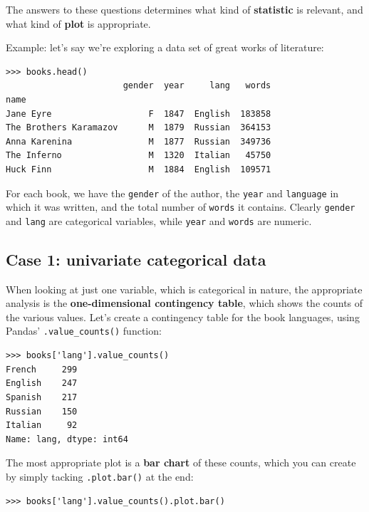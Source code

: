 The answers to these questions determines what kind of \textbf{statistic} is
relevant, and what kind of \textbf{plot} is appropriate.

\bigskip
Example: let's say we're exploring a data set of great works of literature:

\begin{Verbatim}[fontsize=\normalsize,samepage=true,frame=single]
>>> books.head()
                       gender  year     lang   words
name                                                
Jane Eyre                   F  1847  English  183858
The Brothers Karamazov      M  1879  Russian  364153
Anna Karenina               M  1877  Russian  349736
The Inferno                 M  1320  Italian   45750
Huck Finn                   M  1884  English  109571
\end{Verbatim}

For each book, we have the \texttt{gender} of the author, the \texttt{year}
and \texttt{language} in which it was written, and the total number of
\texttt{words} it contains. Clearly \texttt{gender} and \texttt{lang} are
categorical variables, while \texttt{year} and \texttt{words} are numeric.

\pagebreak
\subsection{Case 1: univariate categorical data}
\label{contingencyTable}

When looking at just one variable, which is categorical in nature, the
appropriate analysis is the \textbf{one-dimensional contingency table}, which
shows the counts of the various values. Let's create a contingency table for
the book languages, using Pandas' \texttt{.value\_counts()} function:

\begin{Verbatim}[fontsize=\small,samepage=true,frame=single]
>>> books['lang'].value_counts()
French     299
English    247
Spanish    217
Russian    150
Italian     92
Name: lang, dtype: int64
\end{Verbatim}

The most appropriate plot is a \textbf{bar chart} of these counts, which you
can create by simply tacking \texttt{.plot.bar()} at the end:

\begin{Verbatim}[fontsize=\small,samepage=true,frame=single]
>>> books['lang'].value_counts().plot.bar()
\end{Verbatim}

